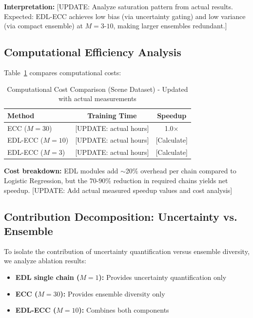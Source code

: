 \documentclass[conference]{IEEEtran}
\begin{document}
\textbf{Interpretation:} [UPDATE: Analyze saturation pattern from actual results. Expected: EDL-ECC achieves low bias (via uncertainty gating) and low variance (via compact ensemble) at $M=3$-$10$, making larger ensembles redundant.]

\subsection{Computational Efficiency Analysis}

Table~\ref{tab:efficiency} compares computational costs:

\begin{table}[t]
\centering
\caption{Computational Cost Comparison (Scene Dataset) - Updated with actual measurements}
\label{tab:efficiency}
\small
\begin{tabular}{lcc}
\toprule
\textbf{Method} & \textbf{Training Time} & \textbf{Speedup} \\
\midrule
ECC ($M=30$) & [UPDATE: actual hours] & 1.0$\times$ \\
EDL-ECC ($M=10$) & [UPDATE: actual hours] & [Calculate] \\
EDL-ECC ($M=3$) & [UPDATE: actual hours] & [Calculate] \\
\bottomrule
\end{tabular}
\end{table}

\textbf{Cost breakdown:} EDL modules add $\sim$20\% overhead per chain compared to Logistic Regression, but the $70$-$90\%$ reduction in required chains yields net speedup. [UPDATE: Add actual measured speedup values and cost analysis]

\subsection{Contribution Decomposition: Uncertainty vs. Ensemble}

To isolate the contribution of uncertainty quantification versus ensemble diversity, we analyze ablation results:

\begin{itemize}
    \item \textbf{EDL single chain ($M=1$):} Provides uncertainty quantification only
    \item \textbf{ECC ($M=30$):} Provides ensemble diversity only
    \item \textbf{EDL-ECC ($M=10$):} Combines both components
\end{itemize}
\end{document}
